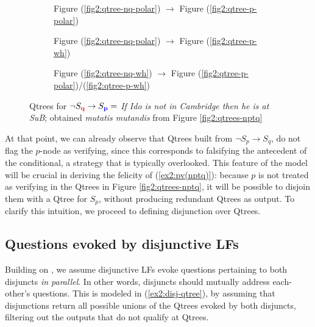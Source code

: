 \begin{figure}[H]
	\centering
	\begin{subfigure}[b]{.3\linewidth}
		\centering
		\caption{Figure (\ref{fig2:qtree-nq-polar}) $\rightarrow$ Figure (\ref{fig2:qtree-p-polar})}\label{fig2:qtree-nqtp-polar-polar}
	\end{subfigure}\hfill
	\begin{subfigure}[b]{.3\linewidth}
		\centering
		\caption{Figure (\ref{fig2:qtree-nq-polar}) $\rightarrow$ Figure (\ref{fig2:qtree-p-wh})}\label{fig2:qtree-nqtp-polar-wh}
	\end{subfigure}\hfill
	\begin{subfigure}[b]{.3\linewidth}
		\centering
		\scalebox{1}{
			\begin{forest}
				[CS [{$\q$}][\fbox{$\p$}][\dbox{$\r$}][\dbox{...}]]
			\end{forest}
		}
		\caption{Figure (\ref{fig2:qtree-nq-wh}) $\rightarrow$ Figure (\ref{fig2:qtree-p-polar})/(\ref{fig2:qtree-p-wh})}\label{fig2:qtree-nqtp-wh}
	\end{subfigure}
	\caption[]{Qtrees for $\neg S\protect_{\textbf{\textcolor{red}{q}}} \rightarrow S\protect_{\textbf{\textcolor{blue}{p}}} =$ \textit{If Ido is not in Cambridge then he is at SuB}; obtained \textit{mutatis mutandis} from Figure \ref{fig2:qtrees-nptq}}
	\label{fig2:qtrees-nqtp}
\end{figure}

At that point, we can already observe that Qtrees built from $\neg S_{p} \rightarrow S_q$, do not flag the $p$-node as verifying, since this corresponds to falsifying the antecedent of the conditional, a strategy that is typically overlooked. This feature of the model will be crucial in deriving the felicity of (\ref{ex2:pv(nptq)}): because $p$ is not treated as verifying in the Qtrees in Figure \ref{fig2:qtrees-nptq}, it will be possible to disjoin them with a Qtree for $S_p$, without producing redundant Qtrees as output. To clarify this intuition, we proceed to defining disjunction over Qtrees.




\subsection{Questions evoked by disjunctive LFs}
Building on \cite{Simons2001,Zhang2022}, we assume disjunctive LFs evoke questions pertaining to both disjuncts \textit{in parallel}. In other words, disjuncts should mutually address each-other's questions. This is modeled in (\ref{ex2:disj-qtree}), by assuming that disjunctions return all possible unions of the Qtrees evoked by both disjuncts, filtering out the outputs that do not qualify at Qtrees.

